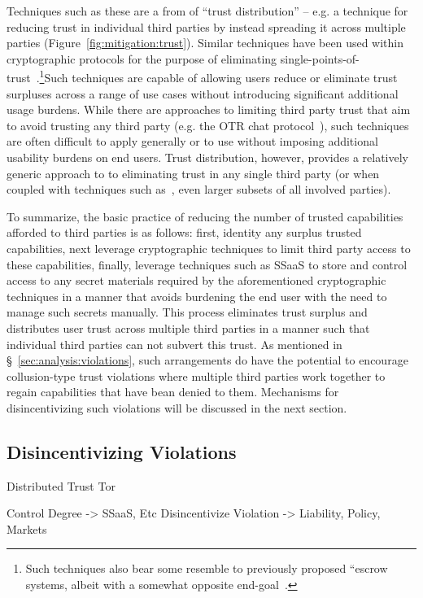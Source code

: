 Techniques such as these are a from of ``trust distribution'' --
e.g. a technique for reducing trust in individual third parties by
instead spreading it across multiple parties
(Figure~\ref{fig:mitigation:trust}). Similar techniques have been used
within cryptographic protocols for the purpose of eliminating
single-points-of-trust~\cite{shamir1979}.\footnote{Such techniques
  also bear some resemble to previously proposed ``escrow systems,
  albeit with a somewhat opposite end-goal~\cite{denning1996}.}Such
techniques are capable of allowing users reduce or eliminate trust
surpluses across a range of use cases without introducing significant
additional usage burdens. While there are approaches to limiting third
party trust that aim to avoid trusting any third party (e.g. the OTR
chat protocol~\cite{otr-v3}), such techniques are often difficult to
apply generally or to use without imposing additional usability
burdens on end users. Trust distribution, however, provides a
relatively generic approach to to eliminating trust in any single
third party (or when coupled with techniques such
as~\cite{shamir1979}, even larger subsets of all involved parties).

To summarize, the basic practice of reducing the number of trusted
capabilities afforded to third parties is as follows: first, identity
any surplus trusted capabilities, next leverage cryptographic
techniques to limit third party access to these capabilities, finally,
leverage techniques such as SSaaS to store and control access to any
secret materials required by the aforementioned cryptographic
techniques in a manner that avoids burdening the end user with the
need to manage such secrets manually. This process eliminates trust
surplus and distributes user trust across multiple third parties in a
manner such that individual third parties can not subvert this
trust. As mentioned in \S~\ref{sec:analysis:violations}, such
arrangements do have the potential to encourage collusion-type trust
violations where multiple third parties work together to regain
capabilities that have bean denied to them. Mechanisms for
disincentivizing such violations will be discussed in the next
section.

\subsection{Disincentivizing Violations}


Distributed Trust Tor

Control Degree -> SSaaS, Etc
Disincentivize Violation -> Liability, Policy, Markets

